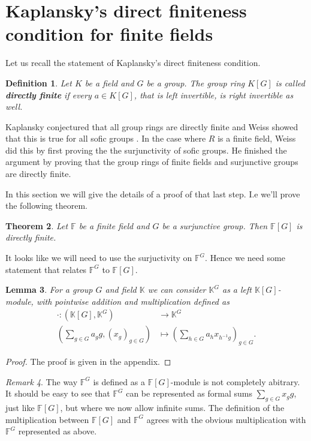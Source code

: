 \documentclass[titlepage, a4paper]{article}
\newcommand{\F}{\mathbb{F}}
\newtheorem{theorem}{Theorem}[section]
\newtheorem{definition}[theorem]{Definition}
\newtheorem{lemma}[theorem]{Lemma}
\theoremstyle{remark}
\newtheorem{remark}[theorem]{Remark}
\begin{document}
	\section{Kaplansky's direct finiteness condition for finite fields}
	Let us recall the statement of Kaplansky's direct finiteness condition.
	\begin{definition}
		Let $K$ be a field and $G$ be a group. The group ring $K[G]$ is called \textbf{directly finite} if every  $a \in K[G]$, that is left invertible, is right invertible as well. 
		
	\end{definition}
	Kaplansky conjectured that all group rings are directly finite and Weiss showed that this is true for all sofic groups \cite{weiss_2000}. 
	In the case where $R$ is a finite field, Weiss did this by first proving the the surjunctivity of sofic groups.
	He finished the argument by proving that the group rings of finite fields and surjunctive groups are directly finite.  

	In this section we will give the details of a proof of that last step. 
	I.e we'll prove the following theorem. 
	\begin{theorem}\label{thm:gottschalk_kaplansky}
		Let $\F$ be a finite field and $G$ be a surjunctive group. Then $\F[G]$ is directly finite. 
	\end{theorem}
	It looks like we will need to use the surjuctivity on $\F^{G}$. Hence we need some statement that relates $\F^{G}$ to $\F[G]$.
	\begin{lemma}
		For a group $G$ and field $\mathbb K$ we can consider $\mathbb{K}^{G}$ as a left $\mathbb{K}[G]$-module, with pointwise addition and multiplication defined as
		\begin{align*}
			\cdot : (\mathbb{K}[G] , \mathbb{K}^{G}) &\longrightarrow \mathbb{K}^{G} \\
		\left( \sum_{g \in G} a_g g,  (x_g)_{g \in G}\right)  &\longmapsto \left( \sum_{h \in G} a_h x_{h^{-1}g} \right)_{g \in G}
	.\end{align*} 
	\end{lemma}
	\begin{proof}
		The proof is given in the appendix.
	\end{proof}
        \begin{remark}
        The way $\F^{G}$ is defined as a $\F[G]$-module is not completely abitrary. It should be easy to see that  $\F^{G}$ can be represented as formal sums $\sum_{g \in G} x_g g$, just like $\F[G]$, but where we now allow infinite sums. 
        The definition of the multiplication between  $\F[G]$ and  $\F^{G}$ agrees with the obvious multiplication with $\F^{G}$ represented as above. 
    \end{remark}
    
\end{document}
